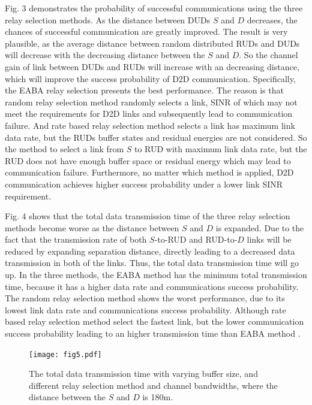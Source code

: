 \documentclass[conference]{IEEEtran}
\begin{document}
Fig. 3 demonstrates the probability of successful communications using the three relay selection methods. As the distance between DUDs $S$ and $D$ decreases, the chances of successful communication are greatly improved. The result is very plausible, as the average distance between random distributed RUDs and DUDs will decrease with the decreasing distance between the $S$ and $D$. So the channel gain of link between DUDs and RUDs will increase with an decreasing distance, which will improve the success probability of D2D communication. Specifically, the EABA relay selection presents the best performance. The reason is that random relay selection method randomly selects a link, SINR of which may not meet the requirements for D2D links and subsequently lead to communication failure. And rate based relay selection method selects a link has maximum link data rate, but the RUDs buffer states and residual energies are not considered. So the method to select a link from $S$ to RUD with maximum link data rate, but the RUD does not have enough buffer space or residual energy which may lead to communication failure. Furthermore, no matter which method is applied, D2D communication achieves higher success probability under a lower link SINR requirement.

Fig. 4 shows that the total data transmission time of the three relay selection methods become worse as the distance between $S$ and $D$ is expanded. Due to the fact that the transmission rate of both $S$-to-RUD and RUD-to-$D$ links will be reduced by expanding separation distance, directly leading to a decreased data transmission in both of the links. Thus, the total data transmission time will go up. In the three methods, the EABA method has the minimum total transmission time, because it has a higher data rate and communications success probability. The random relay selection method shows the worst performance, due to its lowest link data rate and communications success probability. Although rate based relay selection method select the fastest link, but the lower communication success probability leading to an higher transmission time than EABA method .
\begin{figure}[!t]
\center
\texttt{[image: fig5.pdf]}
\caption{The total data transmission time with varying buffer size, and different relay selection method and channel bandwidths, where the distance between the $S$ and $D$ is 180m.}
\label{fig_time}
\end{figure}
\end{document}
